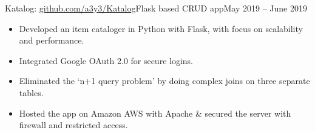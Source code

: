 \begin{cvsubsection}{Katalog: \href{ https://github.com/a3y3/Katalog}{\normalfont github.com/a3y3/Katalog}}{Flask based CRUD app}{May 2019 -- June 2019}
	\begin{itemize}
		\item Developed an item cataloger in Python with Flask, with focus on scalability and performance.
		\item Integrated Google OAuth 2.0 for secure logins.
		\item Eliminated the ‘n+1 query problem’ by doing complex joins on three separate tables.
		\item Hosted the app on Amazon AWS with Apache \& secured the server with firewall and restricted access.
	\end{itemize}
\end{cvsubsection}